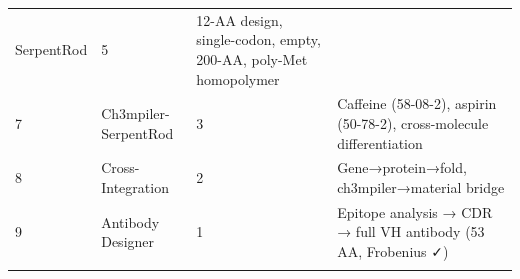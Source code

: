 \begin{longtable}[]{@{}llll@{}}
\begin{minipage}[t]{0.31\columnwidth}
SerpentRod\strut
\end{minipage} & \begin{minipage}[t]{0.20\columnwidth}\raggedright
5\strut
\end{minipage} & \begin{minipage}[t]{0.29\columnwidth}\raggedright
12-AA design, single-codon, empty, 200-AA, poly-Met homopolymer\strut
\end{minipage}\tabularnewline
\begin{minipage}[t]{0.09\columnwidth}\raggedright
7\strut
\end{minipage} & \begin{minipage}[t]{0.31\columnwidth}\raggedright
Ch3mpiler-SerpentRod\strut
\end{minipage} & \begin{minipage}[t]{0.20\columnwidth}\raggedright
3\strut
\end{minipage} & \begin{minipage}[t]{0.29\columnwidth}\raggedright
Caffeine (58-08-2), aspirin (50-78-2), cross-molecule
differentiation\strut
\end{minipage}\tabularnewline
\begin{minipage}[t]{0.09\columnwidth}\raggedright
8\strut
\end{minipage} & \begin{minipage}[t]{0.31\columnwidth}\raggedright
Cross-Integration\strut
\end{minipage} & \begin{minipage}[t]{0.20\columnwidth}\raggedright
2\strut
\end{minipage} & \begin{minipage}[t]{0.29\columnwidth}\raggedright
Gene→protein→fold, ch3mpiler→material bridge\strut
\end{minipage}\tabularnewline
\begin{minipage}[t]{0.09\columnwidth}\raggedright
9\strut
\end{minipage} & \begin{minipage}[t]{0.31\columnwidth}\raggedright
Antibody Designer\strut
\end{minipage} & \begin{minipage}[t]{0.20\columnwidth}\raggedright
1\strut
\end{minipage} & \begin{minipage}[t]{0.29\columnwidth}\raggedright
Epitope analysis → CDR → full VH antibody (53 AA, Frobenius ✓)\strut
\end{minipage}\tabularnewline
\begin{minipage}[t]{0.09\columnwidth}\raggedright

\end{minipage}
\end{longtable}
